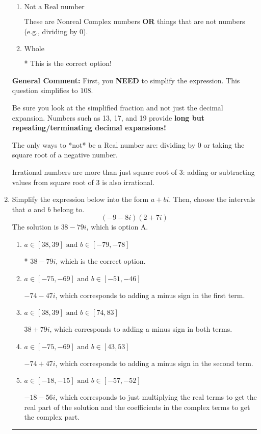 \documentclass{extbook}[14pt]
\newcommand{\litem}[1]{\item #1

\rule{\textwidth}{0.4pt}}
\begin{document}
\begin{enumerate}
{\begin{enumerate}[label=\Alph*.]
These cannot be written as a fraction of Integers.
\item \( \text{Not a Real number} \)

These are Nonreal Complex numbers \textbf{OR} things that are not numbers (e.g., dividing by 0).
\item \( \text{Whole} \)

* This is the correct option!
\end{enumerate}

\textbf{General Comment:} First, you \textbf{NEED} to simplify the expression. This question simplifies to $108$. 
 
 Be sure you look at the simplified fraction and not just the decimal expansion. Numbers such as 13, 17, and 19 provide \textbf{long but repeating/terminating decimal expansions!} 
 
 The only ways to *not* be a Real number are: dividing by 0 or taking the square root of a negative number. 
 
 Irrational numbers are more than just square root of 3: adding or subtracting values from square root of 3 is also irrational.
}
\litem{
Simplify the expression below into the form $a+bi$. Then, choose the intervals that $a$ and $b$ belong to.
\[ (-9 - 8 i)(2 + 7 i) \]The solution is \( 38 - 79 i \), which is option A.\begin{enumerate}[label=\Alph*.]
\item \( a \in [38, 39] \text{ and } b \in [-79, -78] \)

* $38 - 79 i$, which is the correct option.
\item \( a \in [-75, -69] \text{ and } b \in [-51, -46] \)

 $-74 - 47 i$, which corresponds to adding a minus sign in the first term.
\item \( a \in [38, 39] \text{ and } b \in [74, 83] \)

 $38 + 79 i$, which corresponds to adding a minus sign in both terms.
\item \( a \in [-75, -69] \text{ and } b \in [43, 53] \)

 $-74 + 47 i$, which corresponds to adding a minus sign in the second term.
\item \( a \in [-18, -15] \text{ and } b \in [-57, -52] \)

 $-18 - 56 i$, which corresponds to just multiplying the real terms to get the real part of the solution and the coefficients in the complex terms to get the complex part.
\end{enumerate}

}
\end{enumerate}
\end{document}
